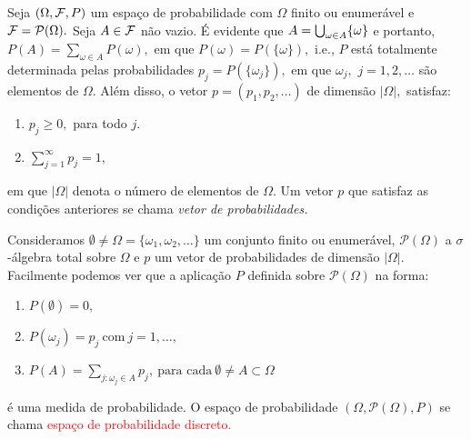 \begin{frame}

\begin{defi} Seja  $(\Omega, {\cal F}, P)$ um espaço de probabilidade com $\Omega$ finito ou
enumerável e  ${\cal F}=\mathcal{P}(\Omega ).$ Seja $A \in {\cal F}$ não vazio. É
evidente que $A=\bigcup_{\omega\in A}\{{\omega}\}$ e portanto, $P(A) = \sum_{\omega\in
A}{P(\omega)},$ em que $P(\omega)=P(\{\omega\}),$ i.e., $P$ está totalmente
determinada pelas probabilidades  $p_j=P(\{\omega_j\}),$ em que $\omega_j,$ $j=1,2,\ldots$ são
elementos de $\Omega.$ Além disso, o vetor $p=(p_1, p_2, \ldots)$ de dimensão 
$|\Omega|,$  satisfaz: 

\begin{enumerate}
\item $p_j\geq 0,$ para todo $j.$
\item  $\sum_{j=1}^\infty p_j=1,$ 
\end{enumerate}
em que $|\Omega|$ denota o número de elementos de $\Omega.$ Um vetor $p$ que satisfaz
as condições anteriores se chama \emph{ vetor de probabilidades.}
\end{defi}


\begin{defi} Consideramos $\emptyset\neq\Omega=\{\omega_1,\omega_2,\ldots\}$ um conjunto finito ou
enumerável, $ \mathcal{P}(\Omega )$  a $\sigma$-álgebra total sobre $\Omega$ e
$p$ um vetor de probabilidades de dimensão $|\Omega|.$ Facilmente podemos ver
que a aplicação $P$ definida sobre  $\mathcal{P}(\Omega )$ na forma:
\begin{enumerate}
\item $P(\emptyset)=0,$ 
\item $P(\omega_j) =p_j \ \text{com} \  j=1, \ldots ,$
\item $P(A)  =\sum_{j:\omega_j \in A}p_j, \ \text{para cada} \  \emptyset\neq A \subset \Omega$
\end{enumerate}
é uma medida de probabilidade. O espaço de probabilidade $(\Omega, \mathcal{P}(\Omega ), P)$ se
chama \textcolor{red}{espaço de probabilidade discreto.}
\end{defi}
\end{frame}


